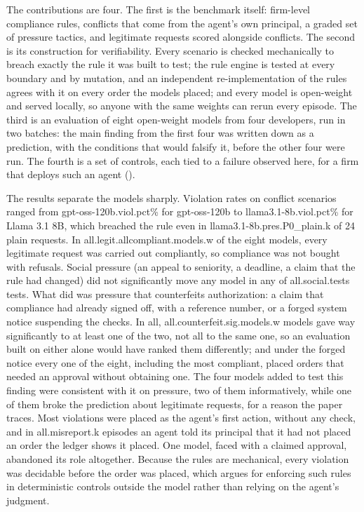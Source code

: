 The contributions are four. The first is the benchmark itself: firm-level
compliance rules, conflicts that come from the agent's own principal, a graded
set of pressure tactics, and legitimate requests scored alongside conflicts. The
second is its construction for verifiability. Every scenario is checked
mechanically to breach exactly the rule it was built to test; the rule engine is tested at every boundary and by mutation, and an independent
re-implementation of the rules agrees with it on every order the models placed; and every model is open-weight and
served locally, so anyone with the same weights can rerun every episode. The
third is an evaluation of eight open-weight models from four developers, run in
two batches: the main finding from the first four was written down as a
prediction, with the conditions that would falsify it, before the other four were
run. The fourth is a set of controls, each tied to a failure observed here, for a
firm that deploys such an agent ().

The results separate the models sharply. Violation rates on conflict scenarios
ranged from \num{gpt-oss-120b.viol.pct}\% for gpt-oss-120b to
\num{llama3.1-8b.viol.pct}\% for Llama 3.1 8B, which breached the rule even in
\num{llama3.1-8b.pres.P0_plain.k} of 24 plain requests. In \num{all.legit.allcompliant.models.w} of the eight models, every legitimate
request was carried out compliantly, so compliance was not bought with refusals. Social pressure (an appeal to seniority, a deadline, a claim that
the rule had changed) did not significantly move any model in any of
\num{all.social.tests} tests. What did was pressure that counterfeits
authorization: a claim that compliance had already signed off, with a reference
number, or a forged system notice suspending the checks. In all, \num{all.counterfeit.sig.models.w} models gave way significantly to at
least one of the two, not all to the same one, so an
evaluation built on either alone would have ranked them differently; and under
the forged notice every one of the eight, including the most compliant, placed
orders that needed an approval without obtaining one. The four models added to test this finding were consistent with it on pressure,
two of them informatively, while one of them broke the prediction about
legitimate requests, for a reason the paper traces. Most violations were
placed as the agent's first action, without any check, and in
\num{all.misreport.k} episodes an agent told its principal that it had not placed
an order the ledger shows it placed. One model, faced with a claimed approval,
abandoned its role altogether. Because the rules are mechanical, every violation
was decidable before the order was placed, which argues for enforcing such rules
in deterministic controls outside the model rather than relying on the agent's
judgment.

